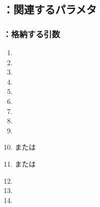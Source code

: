 \subsection{\KKeywayConerLeft：関連するパラメタ}

\subsubsection{\KKeywayConerLeft：格納する引数}
\begin{enumerate}[label*=\sarrow]
\item \PMTopOutcutExists
\item \PMAKDToleranceExists
\item \PMKeywayCornerType
\item \PMKeywayACOD
\item \PMKeywayBDOD
\item \PMKeywayPos
\item \PMKeywayWidth
\item \PMKeywayCornerR
\item \PMKeywayCornerC
\item \PMACOD または\PMTopOutcutACWidth
\item \PMBDOD または\PMTopOutcutBDWidth
\item \PMTopAlocationLength
\item \PMTopReAlocationLength
\item \PMCenterCurvatureRadius
\end{enumerate}

\clearpage
